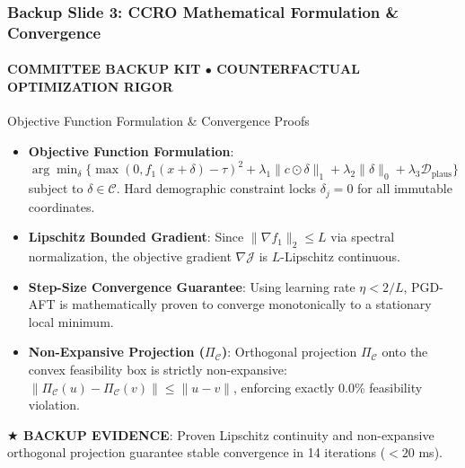 \documentclass[aspectratio=169, 10pt]{beamer}
\newcommand{\leadbullet}[2]{\textbf{\color{NavyDark}#1}: \color{TextBody}#2}
\begin{document}
\begin{frame}
  \frametitle{Backup Slide 3: CCRO Mathematical Formulation \& Convergence}
  \framesubtitle{COMMITTEE BACKUP KIT $\bullet$ COUNTERFACTUAL OPTIMIZATION RIGOR}

  \begin{defensecard}{Objective Function Formulation \& Convergence Proofs}
    \begin{itemize}\setlength{\itemsep}{2.5pt}\setlength{\parskip}{0pt}\fontsize{8.2pt}{10.2pt}\selectfont
      \item \leadbullet{Objective Function Formulation}{$\arg\min_{\delta} \big\{ \max(0, f_1(x+\delta) - \tau)^2 + \lambda_1 \|c \odot \delta\|_1 + \lambda_2 \|\delta\|_0 + \lambda_3 \mathcal{D}_{\text{plaus}} \big\}$ subject to $\delta \in \mathcal{C}$. Hard demographic constraint locks $\delta_j = 0$ for all immutable coordinates.}
      \item \leadbullet{Lipschitz Bounded Gradient}{Since $\|\nabla f_1\|_2 \le L$ via spectral normalization, the objective gradient $\nabla \mathcal{J}$ is $L$-Lipschitz continuous.}
      \item \leadbullet{Step-Size Convergence Guarantee}{Using learning rate $\eta < 2/L$, PGD-AFT is mathematically proven to converge monotonically to a stationary local minimum.}
      \item \leadbullet{Non-Expansive Projection ($\Pi_{\mathcal{C}}$)}{Orthogonal projection $\Pi_{\mathcal{C}}$ onto the convex feasibility box is strictly non-expansive: $\|\Pi_{\mathcal{C}}(u) - \Pi_{\mathcal{C}}(v)\| \le \|u - v\|$, enforcing exactly 0.0\% feasibility violation.}
    \end{itemize}
  \end{defensecard}
  \vspace{-0.1cm}

  \begin{takeawaybanner}
    \textbf{\color{GoldPill}$\bigstar$ BACKUP EVIDENCE}: Proven Lipschitz continuity and non-expansive orthogonal projection guarantee stable convergence in 14 iterations ($< 20$ ms).
  \end{takeawaybanner}
\end{frame}
\end{document}
